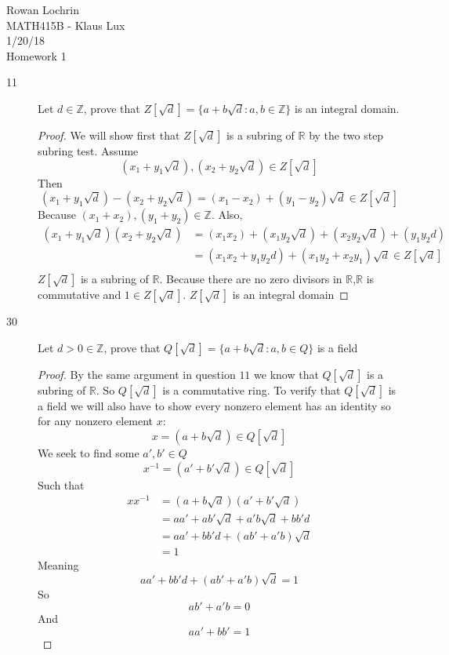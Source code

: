 \documentclass[11pt]{article}
\newcommand{\R}{\mathbb{R}}
\newcommand{\Z}{\mathbb{Z}}
\begin{document}
\begin{flushleft}
	Rowan Lochrin \\
	MATH415B - Klaus Lux \\
	1/20/18 \\
	Homework 1
\end{flushleft}
\begin{description}
	\item[11]
Let $d \in \Z$, prove that $Z[\sqrt{d}] = \{a + b\sqrt{d}: a,b \in \Z \} $
is an integral domain.

\begin{proof}
	We will show first that $Z[\sqrt{d}]$ is a subring of $\R$ by the two step subring test.
	Assume $$(x_1 + y_1\sqrt{d}), (x_2 + y_2\sqrt{d}) \in Z[\sqrt{d}]$$
	Then 
	$$ (x_1 + y_1\sqrt{d}) - (x_2 + y_2\sqrt{d}) =
	 (x_1 - x_2) + (y_1 - y_2)\sqrt{d} \in Z[\sqrt{d}]$$
	Because $(x_1 + x_2), (y_1 + y_2) \in \Z$. Also,
	\begin{align*}
		(x_1 + y_1\sqrt{d})(x_2 + y_2\sqrt{d}) &=
		(x_1x_2) + (x_1y_2\sqrt{d}) + (x_2y_2\sqrt{d}) + (y_1 y_2d) \\
		&= (x_1x_2 + y_1y_2d) + (x_1y_2 + x_2y_1 )\sqrt{d}\in Z[\sqrt{d}]\\
	\end{align*}
	$Z[\sqrt{d}]$ is a subring of $\R$.
	Because there are no zero divisors in $\R$,$\R$ is commutative and $ 1 \in
	Z[\sqrt{d}]$.
	$Z[\sqrt{d}]$ is an integral domain
\end{proof}
		
\item[30] 
Let $d>0 \in \Z$, prove that $Q[\sqrt{d}] = \{a + b\sqrt{d}: a,b \in Q \} $
is a field
\begin{proof}
	By the same argument in question $11$ we know that $ Q[\sqrt{d}] $ is a
	subring of $\R$. So $ Q[\sqrt{d}] $ is a commutative ring.
	To verify that $Q[\sqrt{d}]$ is a field we will also have to show
	every nonzero element has an identity so for any nonzero element $x$:
		$$ x = (a + b\sqrt{d}) \in Q[\sqrt{d}] $$
	We seek to find some $a',b' \in Q$
		$$ x^{-1} = (a' + b'\sqrt{d}) \in Q[\sqrt{d}]$$
	Such that 
	\begin{align*}
		xx^{-1} & = (a + b\sqrt{d})(a' + b'\sqrt{d})\\
		& = aa' + ab' \sqrt{d} + a'b \sqrt{d} + bb'd \\
		& = aa' +  bb'd + (ab' + a'b)\sqrt{d} \\
		& = 1 
	\end{align*}
	Meaning
	\begin{equation}
		aa' +  bb'd + (ab' + a'b)\sqrt{d} = 1 
	\end{equation}
	So 
		$$ ab' + a'b = 0 $$ 
	And
		$$ aa' + bb' = 1 $$
		

\end{proof}
\end{description}
\end{document}
